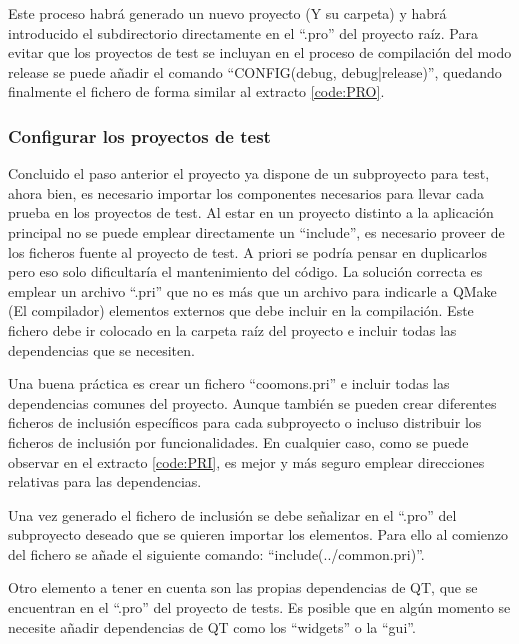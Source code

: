 Este proceso habrá generado un nuevo proyecto (Y su carpeta) y habrá introducido el subdirectorio directamente en el ``.pro'' del proyecto raíz. Para evitar que los proyectos de test se incluyan en el proceso de compilación del modo release se puede añadir el comando ``CONFIG(debug, debug|release)'', quedando finalmente el fichero de forma similar al extracto \ref{code:PRO}.


\subsubsection{Configurar los proyectos de test}

Concluido el paso anterior el proyecto ya dispone de un subproyecto para test, ahora bien, es necesario importar los componentes necesarios para llevar cada prueba en los proyectos de test. Al estar en un proyecto distinto a la aplicación principal no se puede emplear directamente un ``include'', es necesario proveer de los ficheros fuente al proyecto de test. A priori se podría pensar en duplicarlos pero eso solo dificultaría el mantenimiento del código.  
La solución correcta es emplear un archivo ``.pri'' que no es más que un archivo para indicarle a QMake (El compilador) elementos externos que debe incluir en la compilación. Este fichero debe ir colocado en la carpeta raíz del proyecto e incluir todas las dependencias que se necesiten.

Una buena práctica es crear un fichero ``coomons.pri'' e incluir todas las dependencias comunes del proyecto. Aunque también se pueden crear diferentes ficheros de inclusión específicos para cada subproyecto o incluso distribuir los ficheros de inclusión por funcionalidades. En cualquier caso, como se puede observar en el extracto \ref{code:PRI}, es mejor y más seguro emplear direcciones relativas para las dependencias.


Una vez generado el fichero de inclusión se debe señalizar en el ``.pro'' del subproyecto deseado que se quieren importar los elementos. Para ello al comienzo del fichero se añade el siguiente comando: ``include(../common.pri)''.

Otro elemento a tener en cuenta son las propias dependencias de QT, que se encuentran en el ``.pro'' del proyecto de tests. Es posible que en algún momento se necesite añadir dependencias de QT como los ``widgets'' o la ``gui''.

